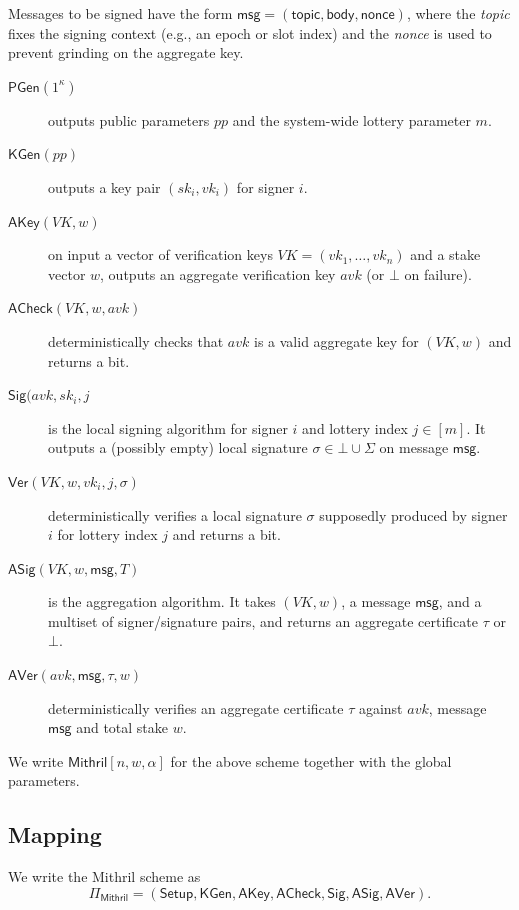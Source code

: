 \documentclass{article}
\begin{document}
Messages to be signed have the form $\mathsf{msg} = (\mathsf{topic}, \mathsf{body}, \mathsf{nonce})$, where the \emph{topic} fixes the signing context (e.g., an epoch or slot index) and the \emph{nonce} is used to prevent grinding on the aggregate key.

\begin{description} 
  \item[$\mathsf{PGen}(1^\kappa)$] outputs public parameters $pp$ and the system-wide lottery parameter $m$. 
  \item[$\mathsf{KGen}(pp)$] outputs a key pair $(sk_i, vk_i)$ for signer $i$. 
  \item[$\mathsf{AKey}(VK, w)$] on input a vector of verification keys $VK = (vk_1,\dots,vk_n)$ and a stake vector $w$, outputs an aggregate verification key $avk$ (or $\bot$ on failure). 
  \item[$\mathsf{ACheck}(VK, w, avk)$] deterministically checks that $avk$ is a valid aggregate key for $(VK,w)$ and returns a bit. 
  \item[$\mathsf{Sig}(avk, sk_i, j$] is the local signing algorithm for signer $i$ and lottery index $j \in [m]$. It outputs a (possibly empty) local signature $\sigma \in {\bot} \cup \Sigma$ on message $\mathsf{msg}$.
  \item[$\mathsf{Ver}(VK, w, vk_i, j, \sigma)$] deterministically verifies a local signature $\sigma$ supposedly produced by signer $i$ for lottery index $j$ and returns a bit. 
  \item[$\mathsf{ASig}(VK, w, \mathsf{msg}, T)$] is the aggregation algorithm. It takes $(VK,w)$, a message $\mathsf{msg}$, and a multiset of signer/signature pairs, and returns an aggregate certificate $\tau$ or $\bot$. 
  \item[$\mathsf{AVer}(avk, \mathsf{msg}, \tau, w)$] deterministically verifies an aggregate certificate $\tau$ against $avk$, message $\mathsf{msg}$ and total stake $w$. \end{description}

We write $\mathsf{Mithril}[n,w,\alpha]$ for the above scheme together with the global parameters.



\subsection{Mapping}

We write the Mithril scheme as
\[
  \Pi_{\mathsf{Mithril}}
  =
  (\mathsf{Setup}, \mathsf{KGen}, \mathsf{AKey}, \mathsf{ACheck}, \mathsf{Sig}, \mathsf{ASig}, \mathsf{AVer}).
\]
\end{document}
